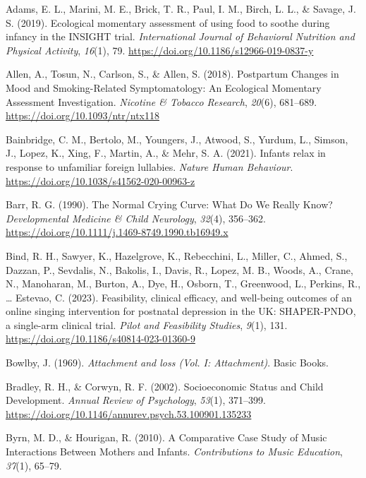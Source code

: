 \documentclass[
]{article}
\newlength{\cslhangindent}
\newenvironment{CSLReferences}[2] %
 {\begin{list}{}{%
  \setlength{\itemindent}{0pt}
  \setlength{\leftmargin}{0pt}
  \setlength{\parsep}{0pt}
  \ifodd #1
   \setlength{\leftmargin}{\cslhangindent}
   \setlength{\itemindent}{-1\cslhangindent}
  \fi
  \setlength{\itemsep}{#2\baselineskip}}}
 {\end{list}}
\begin{document}
\label{refs}
\begin{CSLReferences}{1}{0}
Adams, E. L., Marini, M. E., Brick, T. R., Paul, I. M., Birch, L. L., \&
Savage, J. S. (2019). Ecological momentary assessment of using food to
soothe during infancy in the {INSIGHT} trial. \emph{International
Journal of Behavioral Nutrition and Physical Activity}, \emph{16}(1),
79. \url{https://doi.org/10.1186/s12966-019-0837-y}

Allen, A., Tosun, N., Carlson, S., \& Allen, S. (2018). Postpartum
{Changes} in {Mood} and {Smoking-Related Symptomatology}: {An Ecological
Momentary Assessment Investigation}. \emph{Nicotine \& Tobacco
Research}, \emph{20}(6), 681--689.
\url{https://doi.org/10.1093/ntr/ntx118}

Bainbridge, C. M., Bertolo, M., Youngers, J., Atwood, S., Yurdum, L.,
Simson, J., Lopez, K., Xing, F., Martin, A., \& Mehr, S. A. (2021).
Infants relax in response to unfamiliar foreign lullabies. \emph{Nature
Human Behaviour}. \url{https://doi.org/10.1038/s41562-020-00963-z}

Barr, R. G. (1990). The {Normal Crying Curve}: {What Do We Really Know}?
\emph{Developmental Medicine \& Child Neurology}, \emph{32}(4),
356--362. \url{https://doi.org/10.1111/j.1469-8749.1990.tb16949.x}

Bind, R. H., Sawyer, K., Hazelgrove, K., Rebecchini, L., Miller, C.,
Ahmed, S., Dazzan, P., Sevdalis, N., Bakolis, I., Davis, R., Lopez, M.
B., Woods, A., Crane, N., Manoharan, M., Burton, A., Dye, H., Osborn,
T., Greenwood, L., Perkins, R., \ldots{} Estevao, C. (2023).
Feasibility, clinical efficacy, and well-being outcomes of an online
singing intervention for postnatal depression in the {UK}:
{SHAPER-PNDO}, a single-arm clinical trial. \emph{Pilot and Feasibility
Studies}, \emph{9}(1), 131.
\url{https://doi.org/10.1186/s40814-023-01360-9}

Bowlby, J. (1969). \emph{Attachment and loss ({Vol}. {I}:
{Attachment})}. Basic Books.

Bradley, R. H., \& Corwyn, R. F. (2002). Socioeconomic {Status} and
{Child Development}. \emph{Annual Review of Psychology}, \emph{53}(1),
371--399. \url{https://doi.org/10.1146/annurev.psych.53.100901.135233}

Byrn, M. D., \& Hourigan, R. (2010). A {Comparative Case Study} of
{Music Interactions Between Mothers} and {Infants}. \emph{Contributions
to Music Education}, \emph{37}(1), 65--79.


\end{CSLReferences}
\end{document}
